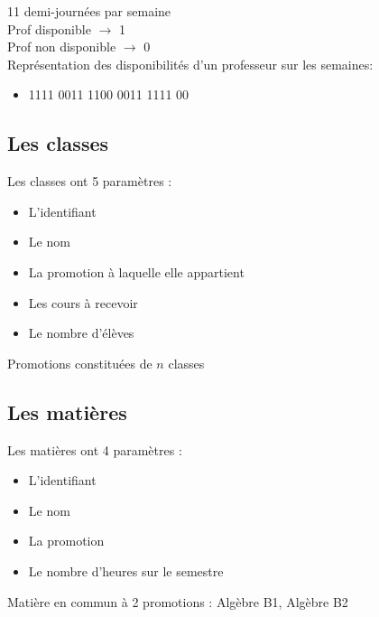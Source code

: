 \documentclass{beamer}
\begin{document}
\begin{frame}
11 demi-journées par semaine\\

Prof disponible  $\rightarrow$ 1\\
Prof non disponible  $\rightarrow$ 0\\
\vspace{\baselineskip}
Représentation des disponibilités d'un professeur sur les semaines:
\begin{itemize}
\item 1111 0011 1100 0011 1111 00
\end{itemize}
\end{frame}

\subsection{Les classes}
\begin{frame}
Les classes ont 5 paramètres : 
\begin{itemize}
\item L'identifiant
\item Le nom
\item La promotion à laquelle elle appartient
\item Les cours à recevoir
\item Le nombre d'élèves\\
\end{itemize}
\vspace{\baselineskip}
Promotions constituées de $n$ classes
\end{frame}

\subsection{Les matières}
\begin{frame}
Les matières ont 4 paramètres : 
\begin{itemize}
\item L'identifiant
\item Le nom
\item La promotion
\item Le nombre d'heures sur le semestre\\
\end{itemize}
\vspace{\baselineskip}
Matière en commun à 2 promotions : Algèbre B1, Algèbre B2\\ 
\end{frame}
\end{document}
